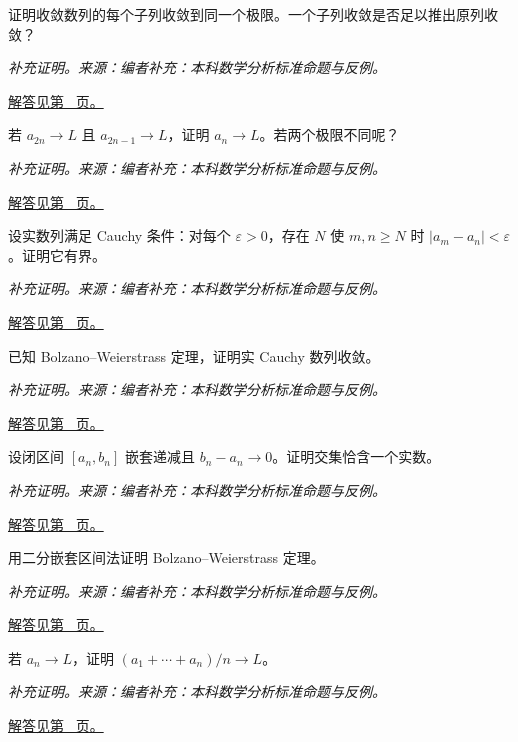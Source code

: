 \documentclass[UTF8,12pt,a4paper,fontset=fandol]{ctexart}
\begin{document}
\begin{example}[收敛子列与原列]\label{ex:c2q7}
证明收敛数列的每个子列收敛到同一个极限。一个子列收敛是否足以推出原列收敛？
\par\textit{补充证明。来源：编者补充：本科数学分析标准命题与反例。}\par\hyperref[ans:c2q7]{解答见第~\pageref{ans:c2q7} 页。}
\end{example}
\begin{example}[奇偶子列判别]\label{ex:c2q8}
若 $a_{2n}\to L$ 且 $a_{2n-1}\to L$，证明 $a_n\to L$。若两个极限不同呢？
\par\textit{补充证明。来源：编者补充：本科数学分析标准命题与反例。}\par\hyperref[ans:c2q8]{解答见第~\pageref{ans:c2q8} 页。}
\end{example}
\begin{example}\label{ex:c2q9}
设实数列满足 Cauchy 条件：对每个 $\varepsilon>0$，存在 $N$ 使 $m,n\ge N$ 时 $|a_m-a_n|<\varepsilon$。证明它有界。
\par\textit{补充证明。来源：编者补充：本科数学分析标准命题与反例。}\par\hyperref[ans:c2q9]{解答见第~\pageref{ans:c2q9} 页。}
\end{example}
\begin{example}\label{ex:c2q10}
已知 Bolzano--Weierstrass 定理，证明实 Cauchy 数列收敛。
\par\textit{补充证明。来源：编者补充：本科数学分析标准命题与反例。}\par\hyperref[ans:c2q10]{解答见第~\pageref{ans:c2q10} 页。}
\end{example}
\begin{example}[嵌套区间定理]\label{ex:c2q11}
设闭区间 $[a_n,b_n]$ 嵌套递减且 $b_n-a_n\to0$。证明交集恰含一个实数。
\par\textit{补充证明。来源：编者补充：本科数学分析标准命题与反例。}\par\hyperref[ans:c2q11]{解答见第~\pageref{ans:c2q11} 页。}
\end{example}
\begin{example}[有界数列必有收敛子列]\label{ex:c2q12}
用二分嵌套区间法证明 Bolzano--Weierstrass 定理。
\par\textit{补充证明。来源：编者补充：本科数学分析标准命题与反例。}\par\hyperref[ans:c2q12]{解答见第~\pageref{ans:c2q12} 页。}
\end{example}
\begin{example}\label{ex:c2q13}
若 $a_n\to L$，证明 $(a_1+\cdots+a_n)/n\to L$。
\par\textit{补充证明。来源：编者补充：本科数学分析标准命题与反例。}\par\hyperref[ans:c2q13]{解答见第~\pageref{ans:c2q13} 页。}
\end{example}
\end{document}
